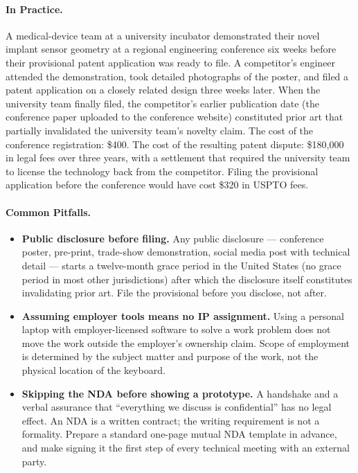 \paragraph{In Practice.}
A medical-device team at a university incubator demonstrated their novel implant
sensor geometry at a regional engineering conference six weeks before their
provisional patent application was ready to file.
A competitor's engineer attended the demonstration, took detailed photographs of
the poster, and filed a patent application on a closely related design three weeks
later.
When the university team finally filed, the competitor's earlier publication date
(the conference paper uploaded to the conference website) constituted prior art
that partially invalidated the university team's novelty claim.
The cost of the conference registration: \$400.
The cost of the resulting patent dispute: \$180,000 in legal fees over three
years, with a settlement that required the university team to license the
technology back from the competitor.
Filing the provisional application before the conference would have cost \$320 in
USPTO fees.

\paragraph{Common Pitfalls.}
\begin{itemize}
  \item \textbf{Public disclosure before filing.}
        Any public disclosure --- conference poster, pre-print, trade-show
        demonstration, social media post with technical detail --- starts a
        twelve-month grace period in the United States (no grace period in most
        other jurisdictions) after which the disclosure itself constitutes
        invalidating prior art.
        File the provisional before you disclose, not after.

  \item \textbf{Assuming employer tools means no IP assignment.}
        Using a personal laptop with employer-licensed software to solve a work
        problem does not move the work outside the employer's ownership claim.
        Scope of employment is determined by the subject matter and purpose of
        the work, not the physical location of the keyboard.

  \item \textbf{Skipping the NDA before showing a prototype.}
        A handshake and a verbal assurance that ``everything we discuss is
        confidential'' has no legal effect.
        An NDA is a written contract; the writing requirement is not a formality.
        Prepare a standard one-page mutual NDA template in advance, and make
        signing it the first step of every technical meeting with an external party.
\end{itemize}

